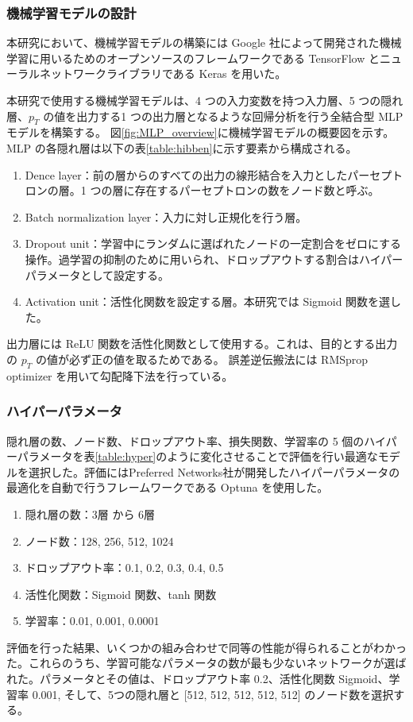 \subsubsection{機械学習モデルの設計}

本研究において、機械学習モデルの構築には Google 社によって開発された機械学習に用いるためのオープンソースのフレームワークである TensorFlow \cite{article:TensorFlow}とニューラルネットワークライブラリである Keras \cite{article:keras}を用いた。

本研究で使用する機械学習モデルは、4 つの入力変数を持つ入力層、5 つの隠れ層、$p_T$ の値を出力する1 つの出力層となるような回帰分析を行う全結合型 MLP モデルを構築する。
図\ref{fig:MLP_overview}に機械学習モデルの概要図を示す。
MLP の各隠れ層は以下の表\ref{table:hibben}に示す要素から構成される。
\begin{enumerate}\label{table:hibben}
   \item Dence layer：前の層からのすべての出力の線形結合を入力としたパーセプトロンの層。1 つの層に存在するパーセプトロンの数をノード数と呼ぶ。
   \item Batch normalization layer：入力に対し正規化を行う層。
   \item Dropout unit：学習中にランダムに選ばれたノードの一定割合をゼロにする操作。過学習の抑制のために用いられ、ドロップアウトする割合はハイパーパラメータとして設定する。
   \item Activation unit：活性化関数を設定する層。本研究では Sigmoid 関数を選した。
\end{enumerate}
出力層には ReLU 関数を活性化関数として使用する。これは、目的とする出力の $p_T$ の値が必ず正の値を取るためである。
誤差逆伝搬法には RMSprop optimizer を用いて勾配降下法を行っている。

\subsubsection{ハイパーパラメータ}
隠れ層の数、ノード数、ドロップアウト率、損失関数、学習率の 5 個のハイパーパラメータを表\ref{table:hyper}のように変化させることで評価を行い最適なモデルを選択した。評価にはPreferred Networks社が開発したハイパーパラメータの最適化を自動で行うフレームワークである Optuna \cite{article:optuna}を使用した。
\begin{enumerate}\label{table:hyper}
   \item 隠れ層の数：3層 から 6層
   \item ノード数：128, 256, 512, 1024
   \item ドロップアウト率：0.1, 0.2, 0.3, 0.4, 0.5
   \item 活性化関数：Sigmoid 関数、tanh 関数
   \item 学習率：0.01, 0.001, 0.0001
\end{enumerate}
評価を行った結果、いくつかの組み合わせで同等の性能が得られることがわかった。これらのうち、学習可能なパラメータの数が最も少ないネットワークが選ばれた。パラメータとその値は、ドロップアウト率 0.2、活性化関数 Sigmoid、学習率 0.001, そして、5つの隠れ層と [512, 512, 512, 512, 512] のノード数を選択する。

